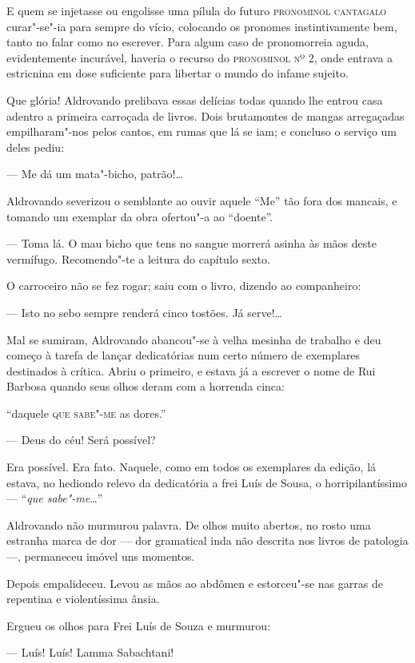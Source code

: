 E quem se injetasse ou engolisse uma pílula do futuro \textsc{pronominol
cantagalo} curar"-se"-ia para sempre do vício, colocando os pronomes
instintivamente bem, tanto no falar como no escrever. Para algum caso de
pronomorreia aguda, evidentemente incurável, haveria o recurso do
\textsc{pronominol nº 2}, onde entrava a estricnina em dose suficiente para
libertar o mundo do infame sujeito.

Que glória! Aldrovando prelibava essas delícias todas quando lhe entrou
casa adentro a primeira carroçada de livros. Dois brutamontes de mangas
arregaçadas empilharam"-nos pelos cantos, em rumas que lá se iam; e
concluso o serviço um deles pediu:

--- Me dá um mata"-bicho, patrão!\ldots{}

Aldrovando severizou o semblante ao ouvir aquele ``Me'' tão fora dos
mancais, e tomando um exemplar da obra ofertou"-a ao ``doente''.

--- Toma lá. O mau bicho que tens no sangue morrerá asinha às mãos deste
vermífugo. Recomendo"-te a leitura do capítulo sexto.

O carroceiro não se fez rogar; saiu com o livro, dizendo ao companheiro:

--- Isto no sebo sempre renderá cinco tostões. Já serve!\ldots{}

Mal se sumiram, Aldrovando abancou"-se à velha mesinha de trabalho e deu
começo à tarefa de lançar dedicatórias num certo número de exemplares
destinados à crítica. Abriu o primeiro, e estava já a escrever o nome de
Rui Barbosa quando seus olhos deram com a horrenda cinca:

``daquele \textsc{que sabe"-me} as dores.''

--- Deus do céu! Será possível?

Era possível. Era fato. Naquele, como em todos os exemplares da edição,
lá estava, no hediondo relevo da dedicatória a frei Luís de Sousa, o
horripilantíssimo --- ``\emph{que sabe"-me}\ldots{}''

Aldrovando não murmurou palavra. De olhos muito abertos, no rosto uma
estranha marca de dor --- dor gramatical inda não descrita nos livros de
patologia ---, permaneceu imóvel uns momentos.

Depois empalideceu. Levou as mãos ao abdômen e estorceu"-se nas garras de
repentina e violentíssima ânsia.

Ergueu os olhos para Frei Luís de Souza e murmurou:

--- Luís! Luís! Lamma Sabachtani!

